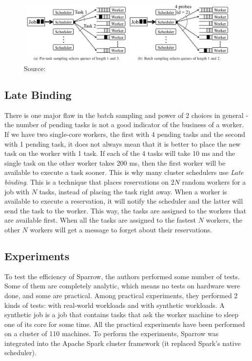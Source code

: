 \documentclass[11pt]{article}
\begin{document}
    \begin{figure}
    	\includegraphics[scale=.28]{fig2}
    	\caption{Source: \cite{sparrow}}
    	\label{fig2}
    \end{figure}


    \subsection{Late Binding}
    
    	There is one major flaw in the batch sampling and power of 2 choices in general - the number of pending tasks is not a good indicator of the business of a worker. If we have two single-core workers, the first with 4 pending tasks and the second with 1 pending task, it does not always mean that it is better to place the new task on the worker with 1 task. If each of the 4 tasks will take 10 ms and the single task on the other worker takes 200 ms, then the first worker will be available to execute a task sooner. This is why many cluster schedulers use \textit{Late binding}. This is a technique that places reservations on $2N$ random workers for a job with $N$ tasks, instead of placing the task right away. When a worker is available to execute a reservation, it will notify the scheduler and the latter will send the task to the worker. This way, the tasks are assigned to the workers that are available first. When all the tasks are assigned to the fastest $N$ workers, the other $N$ workers will get a message to forget about their reservations.


    \subsection{Experiments}
    
    	To test the efficiency of Sparrow, the authors performed some number of tests. Some of them are completely analytic, which means no tests on hardware were done, and some are practical. Among practical experiments, they performed 2 kinds of tests: with real-world workloads and with synthetic workloads. A synthetic job is a job that contains tasks that ask the worker machine to sleep one of its core for some time. All the practical experiments have been performed on a cluster of 110 machines. To perform the experiments, Sparrow was integrated into the Apache Spark cluster framework (it replaced Spark's native scheduler).
\end{document}
